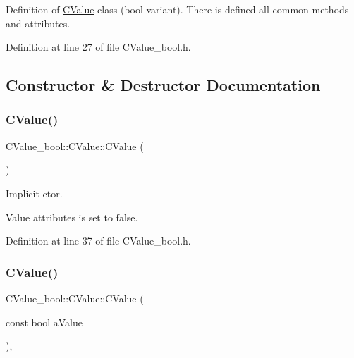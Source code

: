 Definition of \hyperlink{class_c_value__bool_1_1_c_value}{C\+Value} class ({\ttfamily bool} variant). There is defined all common methods and attributes. 

Definition at line 27 of file C\+Value\+\_\+bool.\+h.



\subsection{Constructor \& Destructor Documentation}
\mbox{\label{class_c_value__bool_1_1_c_value_a16e53bf59cc84c4cf0527e08f1f2fde4}} 
\subsubsection{\texorpdfstring{C\+Value()}{CValue()}\hspace{0.1cm}{\footnotesize\ttfamily [1/4]}}
{\footnotesize\ttfamily C\+Value\+\_\+bool\+::\+C\+Value\+::\+C\+Value (\begin{DoxyParamCaption}{ }\end{DoxyParamCaption})\hspace{0.3cm}{\ttfamily [inline]}}



Implicit c\textquotesingle{}tor. 

Value attributes is set to {\ttfamily false}. 

Definition at line 37 of file C\+Value\+\_\+bool.\+h.

\mbox{\label{class_c_value__bool_1_1_c_value_af0fe821e94aae8cbef4e3b427748ddd8}} 
\subsubsection{\texorpdfstring{C\+Value()}{CValue()}\hspace{0.1cm}{\footnotesize\ttfamily [2/4]}}
{\footnotesize\ttfamily C\+Value\+\_\+bool\+::\+C\+Value\+::\+C\+Value (\begin{DoxyParamCaption}\item[{const bool}]{a\+Value }\end{DoxyParamCaption})\hspace{0.3cm}{\ttfamily [inline]}, {\ttfamily [explicit]}}



